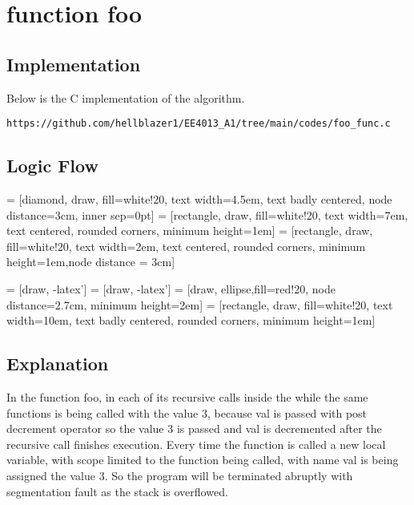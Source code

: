 \documentclass[journal,12pt,twocolumn]{IEEEtran}
\begin{document}
\section{function foo}

\subsection{Implementation}
Below is the C implementation of the algorithm.
\begin{lstlisting}
https://github.com/hellblazer1/EE4013_A1/tree/main/codes/foo_func.c
\end{lstlisting}

\subsection{Logic Flow}
 = [diamond, draw, fill=white!20, 
    text width=4.5em, text badly centered, node distance=3cm, inner sep=0pt]
 = [rectangle, draw, fill=white!20, 
    text width=7em, text centered, rounded corners, minimum height=1em]
 = [rectangle, draw, fill=white!20, 
    text width=2em, text centered, rounded corners, minimum height=1em,node distance = 3cm]
    



 = [draw, -latex']
 = [draw, -latex']
 = [draw, ellipse,fill=red!20, node distance=2.7cm,
    minimum height=2em]
 = [rectangle, draw, fill=white!20, 
    text width=10em, text badly centered, rounded corners, minimum height=1em]

\begin{figure}[!h]
\centering
{}

\end{figure}
    
\subsection{Explanation}
In the function foo, in each of its recursive calls inside the while the same functions is being called with the value 3, because val is passed with post decrement operator so the value 3 is passed and val is decremented after the recursive call finishes execution. Every time the function is called a new local variable, with scope limited to the function being called, with name val is being assigned the value 3. So the program will be terminated abruptly with segmentation fault as the stack is overflowed.
\end{document}
